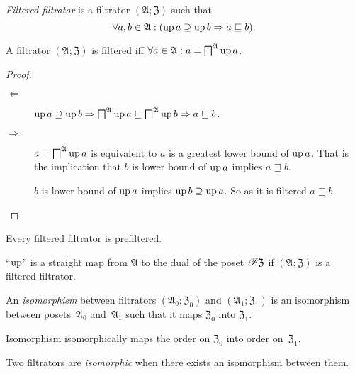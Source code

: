 \begin{defn}
\emph{Filtered filtrator} is a filtrator
$(\mathfrak{A};\mathfrak{Z})$ such that
\[
\forall a,b\in\mathfrak{A}:(\operatorname{up} a\supseteq\operatorname{up} b\Rightarrow a\sqsubseteq b).
\]
\end{defn}
\begin{thm}
A filtrator $(\mathfrak{A};\mathfrak{Z})$ is filtered iff $\forall a\in\mathfrak{A}:a=\bigsqcap^{\mathfrak{A}}\operatorname{up} a$.\end{thm}
\begin{proof}
~
\begin{description}
\item [{$\Leftarrow$}] $\operatorname{up} a\supseteq\operatorname{up} b\Rightarrow\bigsqcap^{\mathfrak{A}}\operatorname{up} a\sqsubseteq\bigsqcap^{\mathfrak{A}}\operatorname{up} b\Rightarrow a\sqsubseteq b$.
\item [{$\Rightarrow$}] $a=\bigsqcap^{\mathfrak{A}}\operatorname{up} a$ is equivalent
to $a$ is a greatest lower bound of $\operatorname{up} a$. That is the implication
that $b$ is lower bound of $\operatorname{up} a$ implies $a\sqsupseteq b$.


$b$ is lower bound of $\operatorname{up} a$ implies $\operatorname{up} b\supseteq\operatorname{up} a$. So
as it is filtered $a\sqsupseteq b$.

\end{description}
\end{proof}
\begin{obvious}
Every filtered filtrator is prefiltered.
\end{obvious}

\begin{obvious}
\label{up-straight}``$\operatorname{up}$'' is a straight map from $\mathfrak{A}$
to the dual of the poset $\mathscr{P}\mathfrak{Z}$ if $(\mathfrak{A};\mathfrak{Z})$
is a filtered filtrator.\end{obvious}
\begin{defn}
An \emph{isomorphism} between filtrators $(\mathfrak{A}_{0};\mathfrak{Z}_{0})$
and $(\mathfrak{A}_{1};\mathfrak{Z}_{1})$ is an isomorphism between
posets~$\mathfrak{A}_{0}$ and~$\mathfrak{A}_{1}$ such that it
maps $\mathfrak{Z}_{0}$ into $\mathfrak{Z}_{1}$.\end{defn}
\begin{obvious}
Isomorphism isomorphically maps the order on $\mathfrak{Z}_{0}$ into
order on~$\mathfrak{Z}_{1}$.\end{obvious}
\begin{defn}
Two filtrators are \emph{isomorphic} when there exists an isomorphism
between them.
\end{defn}

